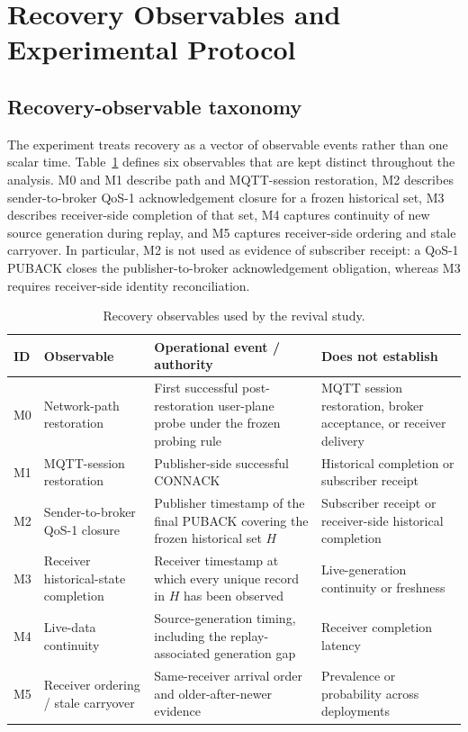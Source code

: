 \documentclass[journal]{IEEEtran}
\begin{document}
\section{Recovery Observables and Experimental Protocol}
\label{sec:protocol}

\subsection{Recovery-observable taxonomy}

The experiment treats recovery as a vector of observable events rather than one scalar time. Table~\ref{tab:observables} defines six observables that are kept distinct throughout the analysis. M0 and M1 describe path and MQTT-session restoration, M2 describes sender-to-broker QoS-1 acknowledgement closure for a frozen historical set, M3 describes receiver-side completion of that set, M4 captures continuity of new source generation during replay, and M5 captures receiver-side ordering and stale carryover. In particular, M2 is not used as evidence of subscriber receipt: a QoS-1 PUBACK closes the publisher-to-broker acknowledgement obligation, whereas M3 requires receiver-side identity reconciliation.

\begin{table}[t]
\centering
\caption{Recovery observables used by the revival study.}
\label{tab:observables}
\begin{tabular}{p{}p{}p{}p{}}
\toprule
\textbf{ID} & \textbf{Observable} & \textbf{Operational event / authority} & \textbf{Does not establish} \\
\midrule
M0 & Network-path restoration & First successful post-restoration user-plane probe under the frozen probing rule & MQTT session restoration, broker acceptance, or receiver delivery \\
M1 & MQTT-session restoration & Publisher-side successful CONNACK & Historical completion or subscriber receipt \\
M2 & Sender-to-broker QoS-1 closure & Publisher timestamp of the final PUBACK covering the frozen historical set $H$ & Subscriber receipt or receiver-side historical completion \\
M3 & Receiver historical-state completion & Receiver timestamp at which every unique record in $H$ has been observed & Live-generation continuity or freshness \\
M4 & Live-data continuity & Source-generation timing, including the replay-associated generation gap & Receiver completion latency \\
M5 & Receiver ordering / stale carryover & Same-receiver arrival order and older-after-newer evidence & Prevalence or probability across deployments \\
\bottomrule
\end{tabular}
\end{table}
\end{document}
